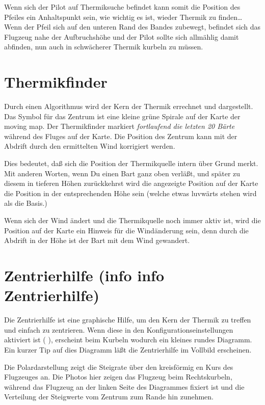 Wenn sich der Pilot auf Thermiksuche befindet kann somit die Position des Pfeiles ein Anhaltspunkt sein,
wie wichtig es ist, wieder Thermik zu finden\dots
Wenn der Pfeil sich auf den unteren Rand des Bandes zubewegt, befindet sich das Flugzeug nahe der Aufbruchshöhe und der Pilot sollte sich allmählig damit abfinden, nun auch in schwächerer Thermik kurbeln zu müssen.

\section{Thermikfinder}
Durch einen Algorithmus wird der Kern der Thermik errechnet und dargestellt.
Das Symbol für das Zentrum ist eine kleine grüne Spirale auf der Karte der moving map.
Der Thermikfinder markiert \textit{fortlaufend  die letzten 20 Bärte} während des Fluges auf der Karte.
Die Position des Zentrum kann mit der Abdrift durch den ermittelten Wind korrigiert werden.

Dies bedeutet, daß \xc sich die Position der Thermikquelle intern über Grund merkt.
Mit anderen Worten, wenn Du einen Bart ganz oben verläßt, und später zu diesem in tieferen
Höhen zurückkehrst wird die angezeigte Position auf der Karte die Position in der
entsprechenden Höhe sein (welche etwas luvwärts stehen wird als die Basis.)

Wenn sich der Wind ändert und die Thermikquelle noch immer aktiv ist,
wird die Position auf der Karte ein Hinweis für die Windänderung sein, denn
durch die Abdrift in der Höhe ist der Bart mit dem Wind gewandert.

\section{Zentrierhilfe (info info Zentrierhilfe)}
Die Zentrierhilfe ist eine graphische Hilfe, um den Kern der Thermik zu treffen und einfach zu zentrieren.
Wenn diese in den Konfigurationseinstellungen aktiviert ist ( ), erscheint beim
Kurbeln wodurch ein kleines  rundes Diagramm. Ein kurzer Tip auf dies Diagramm läßt die Zentrierhilfe im Vollbild erscheinen.

Die Polardarstellung zeigt die Steigrate über den kreisförmig en Kurs des Flugzeuges an.
Die Photos hier zeigen das Flugzeug beim Rechtskurbeln, während das Flugzeug an der linken
Seite des Diagrammes fixiert ist und die Verteilung der Steigwerte vom Zentrum zum Rande hin zunehmen.

